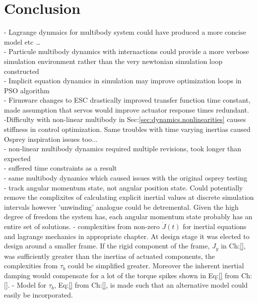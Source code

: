 \chapter{Conclusion}
\label{ch:conclusion}
- Lagrange dynmaics for multibody system could have produced a more concise model etc \ldots\\
- Particule multibody dynamics with internactions could provide a more verbose simulation environment rather than the very newtonian simulation loop constructed\\
- Implicit equation dynamics in simulation may improve optimization loops in PSO algorithm\\
- Firmware changes to ESC drastically improved transfer function time constant, made assumption that servos would improve actuator response times redundant.\\
-Difficulty with non-linear multibody in Sec:\ref{sec:dynamics.nonlinearities} causes stiffness in control optimization. Same troubles with time varying inertias caused Osprey inspiration issues too...\\
- non-linear multibody dynamics required multiple revisions, took longer than expected\\
- suffered time constraints as a result\\
- same multibody dynamics which caused issues with the original osprey testing\cite{}\\
- track angular momentum state, not angular position state. Could potentially remove the complixites of calculating explicit inertial values at discrete simulation intervals however 'unwinding' analogue could be detremental. Given the high degree of freedom the system has, each angular momentum state probably has an entire set of solutions.
- complexities from non-zero $\dot{J}(t)$ for inertial equations and lagrange mechanics in appropriate chapter. At design stage it was elected to design around a smaller frame. If the rigid component of the frame, $J_y$ in Ch:\ref{}, was sufficiently greater than the inertias of actuated components, the complexities from $\tau_b$ could be simplified greater. Moreover the inherent inertial damping would compensate for a lot of the torque spikes shown in Eq:\ref{} from Ch:\ref{}.
- Model for $\tau_b$, Eq:\ref{} from Ch:\ref{}, is made such that an alternative model could easily be incorporated.
